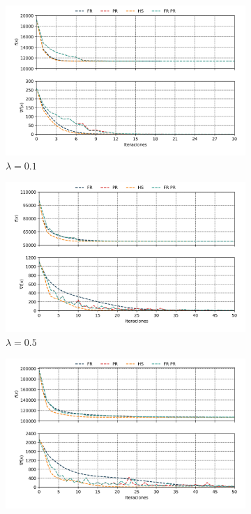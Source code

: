 \begin{figure}[H]
    \centering
    \begin{subfigure}{8.4cm}
        \includegraphics[width=1\textwidth]{Graphics/lambda_1.png}
        \caption{$\lambda = 0.1$}
    \end{subfigure}
    \begin{subfigure}{8.4cm}
        \includegraphics[width=1\textwidth]{Graphics/lambda_2.png}
        \caption{$\lambda = 0.5$}
    \end{subfigure}
    \begin{subfigure}{8.4cm}
        \includegraphics[width=1\textwidth]{Graphics/lambda_3.png}

\end{subfigure}
\end{figure}

